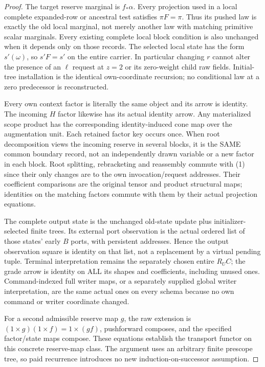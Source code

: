\documentclass[11pt]{article}
\begin{document}
\begin{proof}
The target reserve marginal is $f_*\alpha$. Every projection used in a local complete expanded-row or ancestral test satisfies $\pi F=\pi$. Thus its pushed law is exactly the old local marginal, not merely another law with matching primitive scalar marginals. Every existing complete local block condition is also unchanged when it depends only on those records. The selected local state has the form $s'(\omega)$, so $s'F=s'$ on the entire carrier. In particular changing $r$ cannot alter the presence of an $\ell$ request at $z=2$ or its zero-weight child raw fields. Initial-tree installation is the identical own-coordinate recursion; no conditional law at a zero predecessor is reconstructed.

Every own context factor is literally the same object and its arrow is identity. The incoming $H$ factor likewise has its actual identity arrow. Any materialized scope product has the corresponding identity-induced cone map over the augmentation unit. Each retained factor key occurs once. When root decomposition views the incoming reserve in several blocks, it is the SAME common boundary record, not an independently drawn variable or a new factor in each block. Root splitting, rebracketing and reassembly commute with (1) since their only changes are to the own invocation/request addresses. Their coefficient comparisons are the original tensor and product structural maps; identities on the matching factors commute with them by their actual projection equations.

The complete output state is the unchanged old-state update plus initializer-selected finite trees. Its external port observation is the actual ordered list of those states' early $B$ ports, with persistent addresses. Hence the output observation square is identity on that list, not a replacement by a virtual pending tuple. Terminal interpretation remains the separately chosen entire $R_U C$; the grade arrow is identity on ALL its shapes and coefficients, including unused ones. Command-indexed full writer maps, or a separately supplied global writer interpretation, are the same actual ones on every schema because no own command or writer coordinate changed.

For a second admissible reserve map $g$, the raw extension is $(1\times g)(1\times f)=1\times(gf)$, pushforward composes, and the specified factor/state maps compose. These equations establish the transport functor on this concrete reserve-map class. The argument uses an arbitrary finite prescope tree, so paid recurrence introduces no new induction-on-successor assumption.\end{proof}
\end{document}
